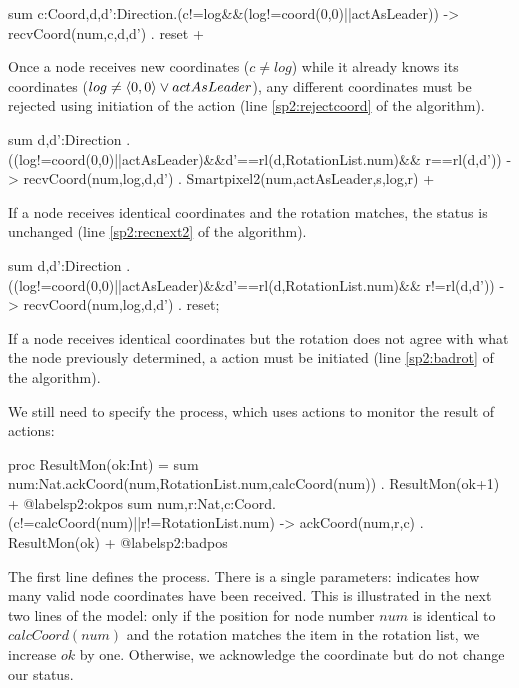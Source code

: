 \begin{codeverb}
sum c:Coord,d,d':Direction.(c!=log&&(log!=coord(0,0)||actAsLeader)) ->
       recvCoord(num,c,d,d') . reset +
\end{codeverb}

Once a node receives new coordinates ($c \neq log$) while it already knows its coordinates ($log \neq \langle 0,0 \rangle \lor actAsLeader$), any different coordinates must be rejected using initiation of the  action (line \ref{sp2:rejectcoord} of the algorithm).

\begin{codeverb}
sum d,d':Direction . ((log!=coord(0,0)||actAsLeader)&&d'==rl(d,RotationList.num)&&
      r==rl(d,d')) ->
       recvCoord(num,log,d,d') . Smartpixel2(num,actAsLeader,s,log,r) +
\end{codeverb}

If a node receives identical coordinates and the rotation matches, the status is unchanged (line \ref{sp2:recnext2} of the algorithm).

\begin{codeverb}
sum d,d':Direction . ((log!=coord(0,0)||actAsLeader)&&d'==rl(d,RotationList.num)&&
      r!=rl(d,d')) ->
       recvCoord(num,log,d,d') . reset;
\end{codeverb}

If a node receives identical coordinates but the rotation does not agree with what the node previously determined, a  action must be initiated (line \ref{sp2:badrot} of the algorithm).

We still need to specify the  process, which uses  actions to monitor the result of  actions:

\begin{codeverb}
proc    ResultMon(ok:Int) =
         sum num:Nat.ackCoord(num,RotationList.num,calcCoord(num)) . ResultMon(ok+1) + @label{sp2:okpos}
         sum num,r:Nat,c:Coord. (c!=calcCoord(num)||r!=RotationList.num) ->
          ackCoord(num,r,c) . ResultMon(ok) + @label{sp2:badpos}
\end{codeverb}

The first line defines the  process. There is a single parameters:  indicates how many valid node coordinates have been received. This is illustrated in the next two lines of the model: only if the position for node number $num$ is identical to $calcCoord(num)$ and the rotation matches the item in the rotation list, we increase $ok$ by one. Otherwise, we acknowledge the coordinate but do not change our status.

